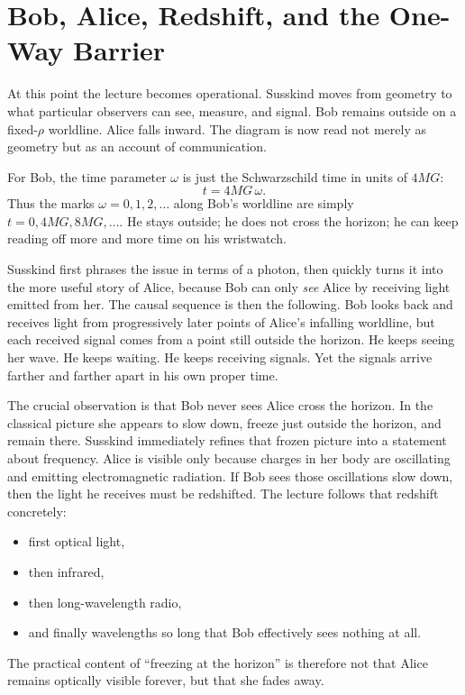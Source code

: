 \section{Bob, Alice, Redshift, and the One-Way Barrier}

At this point the lecture becomes operational. Susskind moves from geometry to what particular observers can see, measure, and signal. Bob remains outside on a fixed-\(\rho\) worldline. Alice falls inward. The diagram is now read not merely as geometry but as an account of communication.

For Bob, the time parameter \(\omega\) is just the Schwarzschild time in units of \(4MG\):
\begin{equation}
t=4MG\,\omega.
\end{equation}
Thus the marks \(\omega=0,1,2,\dots\) along Bob's worldline are simply \(t=0,4MG,8MG,\dots\). He stays outside; he does not cross the horizon; he can keep reading off more and more time on his wristwatch.

Susskind first phrases the issue in terms of a photon, then quickly turns it into the more useful story of Alice, because Bob can only \emph{see} Alice by receiving light emitted from her. The causal sequence is then the following. Bob looks back and receives light from progressively later points of Alice's infalling worldline, but each received signal comes from a point still outside the horizon. He keeps seeing her wave. He keeps waiting. He keeps receiving signals. Yet the signals arrive farther and farther apart in his own proper time.

The crucial observation is that Bob never sees Alice cross the horizon. In the classical picture she appears to slow down, freeze just outside the horizon, and remain there. Susskind immediately refines that frozen picture into a statement about frequency. Alice is visible only because charges in her body are oscillating and emitting electromagnetic radiation. If Bob sees those oscillations slow down, then the light he receives must be redshifted. The lecture follows that redshift concretely:
\begin{itemize}
\item first optical light,
\item then infrared,
\item then long-wavelength radio,
\item and finally wavelengths so long that Bob effectively sees nothing at all.
\end{itemize}
The practical content of ``freezing at the horizon'' is therefore not that Alice remains optically visible forever, but that she fades away.

